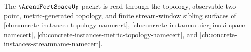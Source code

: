 The $\ArensFortSpaceUp$ packet is read through the topology, observable two-point, metric-generated topology, and finite stream-window sibling surfaces of \autoref{ch:concrete-instances-topology-namecert}, \autoref{ch:concrete-instances-sierpinski-space-namecert}, \autoref{ch:concrete-instances-metric-topology-namecert}, and \autoref{ch:concrete-instances-streamname-namecert}.


